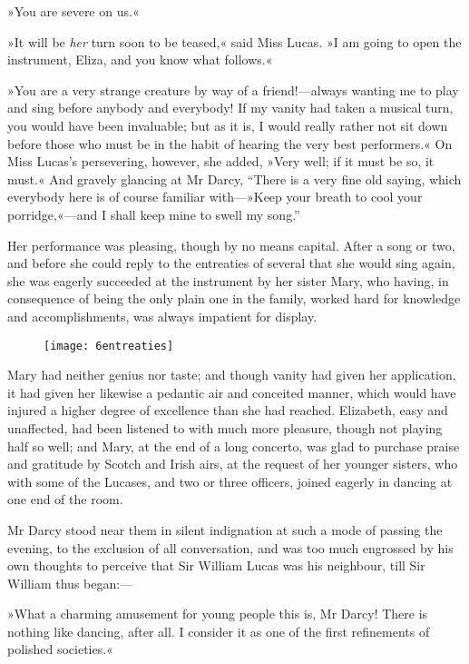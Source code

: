 »You are severe on us.«

»It will be \textit{her} turn soon to be teased,« said Miss Lucas. »I am going to open the instrument, Eliza, and you know what follows.«

»You are a very strange creature by way of a friend!—always wanting me to play and sing before anybody and everybody! If my vanity had taken a musical turn, you would have been invaluable; but as it is, I would really rather not sit down before those who must be in the habit of hearing the very best performers.« On Miss Lucas's persevering, however, she added, »Very well; if it must be so, it must.« And gravely glancing at Mr Darcy, “There is a very fine old saying, which everybody here is of course familiar with—»Keep your breath to cool your porridge,«—and I shall keep mine to swell my song.”

Her performance was pleasing, though by no means capital. After a song or two, and before she could reply to the entreaties of several that she would sing again, she was eagerly succeeded at the instrument by her sister Mary, who having, in consequence of being the only plain one in the family, worked hard for knowledge and accomplishments, was always impatient for display.

\begin{figure}[tbh]
\centering
\texttt{[image: 6entreaties]}
\end{figure}

Mary had neither genius nor taste; and though vanity had given her application, it had given her likewise a pedantic air and conceited manner, which would have injured a higher degree of excellence than she had reached. Elizabeth, easy and unaffected, had been listened to with much more pleasure, though not playing half so well; and Mary, at the end of a long concerto, was glad to purchase praise and gratitude by Scotch and Irish airs, at the request of her younger sisters, who with some of the Lucases, and two or three officers, joined eagerly in dancing at one end of the room.

Mr Darcy stood near them in silent indignation at such a mode of passing the evening, to the exclusion of all conversation, and was too much engrossed by his own thoughts to perceive that Sir William Lucas was his neighbour, till Sir William thus began:—

»What a charming amusement for young people this is, Mr Darcy! There is nothing like dancing, after all. I consider it as one of the first refinements of polished societies.«

